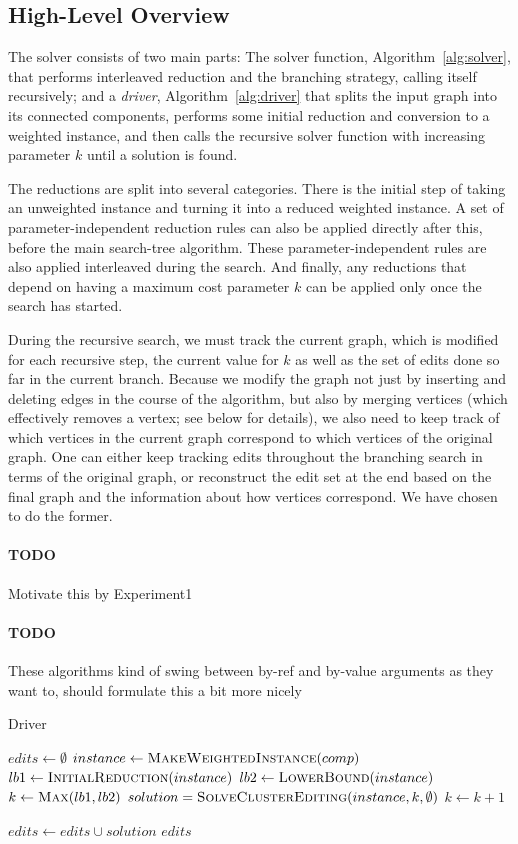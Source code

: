 \documentclass{article}
\newcommand{\todo}[1]{\paragraph{TODO} #1}
\theoremstyle{definition}
\begin{document}
\subsection{High-Level Overview}

The solver consists of two main parts: The solver function, Algorithm~\ref{alg:solver}, that
performs interleaved reduction and the branching strategy, calling itself recursively; and a
\emph{driver}, Algorithm~\ref{alg:driver} that splits the input graph into its connected components,
performs some initial reduction and conversion to a weighted instance, and then calls the recursive
solver function with increasing parameter $k$ until a solution is found. 

The reductions are split into several categories. There is the initial step of taking an
unweighted instance and turning it into a reduced weighted instance. A set of parameter-independent
reduction rules can also be applied directly after this, before the main search-tree algorithm.
These parameter-independent rules are also applied interleaved during the search. And finally, any
reductions that depend on having a maximum cost parameter $k$ can be applied only once the search
has started.

During the recursive search, we must track the current graph, which is modified for each recursive
step, the current value for $k$ as well as the set of edits done so far in the current branch.
Because we modify the graph not just by inserting and deleting edges in the course of the algorithm,
but also by merging vertices (which effectively removes a vertex; see below for details), we also
need to keep track of which vertices in the current graph correspond to which vertices of the
original graph. One can either keep tracking edits throughout the branching search in terms of the
original graph, or reconstruct the edit set at the end based on the final graph and the information
about how vertices correspond. We have chosen to do the former.
\todo Motivate this by Experiment1

\todo These algorithms kind of swing between by-ref and by-value arguments as they want to, should
formulate this a bit more nicely

\begin{algorithm}{Driver}
\caption{Driver}
\label{alg:driver}
\begin{algorithmic}

	\State $edits \gets \emptyset$
		\State $instance \gets \Call{MakeWeightedInstance}{comp}$
		\State $lb1 \gets \Call{InitialReduction}{instance}$
		\State $lb2 \gets \Call{LowerBound}{instance}$
		\State $k \gets \Call{Max}{lb1, lb2}$
		\Repeat
			\State $solution = \Call{SolveClusterEditing}{instance, k, \emptyset}$
			\State $k \gets k + 1$

		\State $edits \gets edits \cup solution$
	\EndFor
	\State \Return $edits$
\EndFunction

\end{algorithmic}
\end{algorithm}
\end{document}
